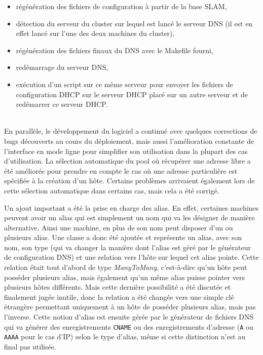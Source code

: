\documentclass[12pt,a4paper,twoside]{report}
\begin{document}
\begin{itemize}
	\item régénération des fichiers de configuration à partir de la base SLAM,
	\item détection du serveur du cluster sur lequel est lancé le serveur DNS
	(il est en effet lancé sur l’une des deux machines du cluster),
	\item régénération des fichiers finaux du DNS avec le Makefile fourni,
	\item redémarrage du serveur DNS,
	\item exécution d’un script sur ce même serveur pour envoyer les fichiers
	de configuration DHCP sur le serveur DHCP placé sur un autre serveur et de
	redémarrer ce serveur DHCP.
\end{itemize}
~\\

En parallèle, le développement du logiciel a continué avec quelques corrections
de bugs découverts au cours du déploiement, mais aussi
l’amélioration constante de l’interface en mode ligne pour simplifier son
utilisation dans la plupart des cas d’utilisation. La sélection automatique du
pool où récupérer une adresse libre a été améliorée pour prendre en compte le
cas où une adresse particulière est spécifiée à la création d’un hôte. Certains
problèmes arrivaient également lors de cette sélection automatique dans
certains cas, mais cela a été corrigé.

Un ajout important a été la prise en charge des alias. En effet, certaines
machines peuvent avoir un alias qui est simplement un nom qui va les désigner
de manière alternative. Ainsi une machine, en plus de son nom peut disposer
d’un ou plusieurs alias. Une classe a donc été ajoutée et représente un alias,
avec son nom, son type (qui va changer la manière dont l’alias est géré par le
générateur de configuration DNS) et une relation vers l’hôte sur lequel cet
alias pointe. Cette relation était tout d’abord de type \emph{ManyToMany},
c'est-à-dire qu’un hôte peut posséder plusieurs alias, mais également qu’un
même alias puisse pointer vers plusieurs hôtes différents. Mais cette dernière
possibilité a été discutée et finalement jugée inutile, donc la relation a été
changée vers une simple clé étrangère permettant uniquement à un hôte de
posséder plusieurs alias, mais pas l’inverse. Cette notion d’alias est ensuite
gérée par le générateur de fichiers DNS qui va générer des enregistrements
\verb+CNAME+ ou des enregistrements d’adresse (\verb+A+ ou \verb+AAAA+ pour le
cas d’IP) selon le type d’alias, même si cette distinction n’est au final pas
utilisée.\\
\end{document}
